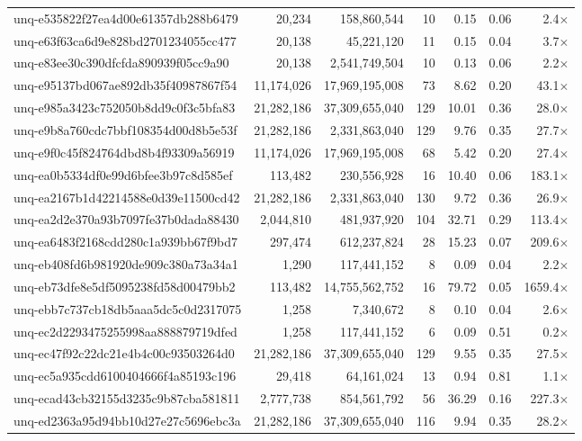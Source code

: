 \begin{table}[h!]
\begin{tabular}{lrrrrrr}
unq-e535822f27ea4d00e61357db288b6479 & 20,234 & 158,860,544 & 10 & 0.15 & 0.06 & 2.4$\times$ \\
unq-e63f63ca6d9e828bd2701234055cc477 & 20,138 & 45,221,120 & 11 & 0.15 & 0.04 & 3.7$\times$ \\
unq-e83ee30c390dfcfda890939f05cc9a90 & 20,138 & 2,541,749,504 & 10 & 0.13 & 0.06 & 2.2$\times$ \\
unq-e95137bd067ae892db35f40987867f54 & 11,174,026 & 17,969,195,008 & 73 & 8.62 & 0.20 & 43.1$\times$ \\
unq-e985a3423c752050b8dd9c0f3c5bfa83 & 21,282,186 & 37,309,655,040 & 129 & 10.01 & 0.36 & 28.0$\times$ \\
unq-e9b8a760cdc7bbf108354d00d8b5e53f & 21,282,186 & 2,331,863,040 & 129 & 9.76 & 0.35 & 27.7$\times$ \\
unq-e9f0c45f824764dbd8b4f93309a56919 & 11,174,026 & 17,969,195,008 & 68 & 5.42 & 0.20 & 27.4$\times$ \\
unq-ea0b5334df0e99d6bfee3b97c8d585ef & 113,482 & 230,556,928 & 16 & 10.40 & 0.06 & 183.1$\times$ \\
unq-ea2167b1d42214588e0d39e11500cd42 & 21,282,186 & 2,331,863,040 & 130 & 9.72 & 0.36 & 26.9$\times$ \\
unq-ea2d2e370a93b7097fe37b0dada88430 & 2,044,810 & 481,937,920 & 104 & 32.71 & 0.29 & 113.4$\times$ \\
unq-ea6483f2168cdd280c1a939bb67f9bd7 & 297,474 & 612,237,824 & 28 & 15.23 & 0.07 & 209.6$\times$ \\
unq-eb408fd6b981920de909c380a73a34a1 & 1,290 & 117,441,152 & 8 & 0.09 & 0.04 & 2.2$\times$ \\
unq-eb73dfe8e5df5095238fd58d00479bb2 & 113,482 & 14,755,562,752 & 16 & 79.72 & 0.05 & 1659.4$\times$ \\
unq-ebb7c737cb18db5aaa5dc5c0d2317075 & 1,258 & 7,340,672 & 8 & 0.10 & 0.04 & 2.6$\times$ \\
unq-ec2d2293475255998aa888879719dfed & 1,258 & 117,441,152 & 6 & 0.09 & 0.51 & 0.2$\times$ \\
unq-ec47f92c22dc21e4b4c00c93503264d0 & 21,282,186 & 37,309,655,040 & 129 & 9.55 & 0.35 & 27.5$\times$ \\
unq-ec5a935cdd6100404666f4a85193c196 & 29,418 & 64,161,024 & 13 & 0.94 & 0.81 & 1.1$\times$ \\
unq-ecad43cb32155d3235c9b87cba581811 & 2,777,738 & 854,561,792 & 56 & 36.29 & 0.16 & 227.3$\times$ \\
unq-ed2363a95d94bb10d27e27c5696ebc3a & 21,282,186 & 37,309,655,040 & 116 & 9.94 & 0.35 & 28.2$\times$ \\

\end{tabular}
\end{table}
